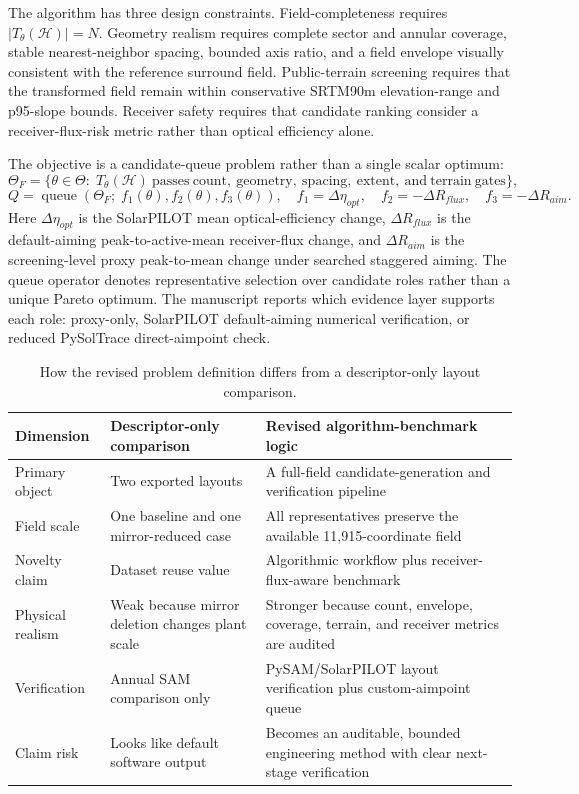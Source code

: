 \documentclass[final,3p,times]{elsarticle}
\begin{document}
The algorithm has three design constraints. Field-completeness requires $|T_\theta(\mathcal{H})|=N$. Geometry realism requires complete sector and annular coverage, stable nearest-neighbor spacing, bounded axis ratio, and a field envelope visually consistent with the reference surround field. Public-terrain screening requires that the transformed field remain within conservative SRTM90m elevation-range and p95-slope bounds. Receiver safety requires that candidate ranking consider a receiver-flux-risk metric rather than optical efficiency alone.

The objective is a candidate-queue problem rather than a single scalar optimum:
\begin{equation}
\Theta_F=\{\theta\in\Theta:\;T_\theta(\mathcal{H})\ \mathrm{passes\ count,\ geometry,\ spacing,\ extent,\ and\ terrain\ gates}\},
\end{equation}
\begin{equation}
Q=\operatorname{queue}\left(\Theta_F;\; f_1(\theta), f_2(\theta), f_3(\theta)\right),
\quad
f_1=\Delta \eta_{opt},\quad
f_2=-\Delta R_{flux},\quad
f_3=-\Delta R_{aim}.
\end{equation}
Here $\Delta \eta_{opt}$ is the SolarPILOT mean optical-efficiency change, $\Delta R_{flux}$ is the default-aiming peak-to-active-mean receiver-flux change, and $\Delta R_{aim}$ is the screening-level proxy peak-to-mean change under searched staggered aiming. The queue operator denotes representative selection over candidate roles rather than a unique Pareto optimum. The manuscript reports which evidence layer supports each role: proxy-only, SolarPILOT default-aiming numerical verification, or reduced PySolTrace direct-aimpoint check.

\begin{table}[t]
\centering
\caption{How the revised problem definition differs from a descriptor-only layout comparison.}
\label{tab:reframe}
\small
\begin{tabular}{p{}p{}p{}}
\toprule
Dimension & Descriptor-only comparison & Revised algorithm-benchmark logic \\
\midrule
Primary object & Two exported layouts & A full-field candidate-generation and verification pipeline \\
Field scale & One baseline and one mirror-reduced case & All representatives preserve the available 11,915-coordinate field \\
Novelty claim & Dataset reuse value & Algorithmic workflow plus receiver-flux-aware benchmark \\
Physical realism & Weak because mirror deletion changes plant scale & Stronger because count, envelope, coverage, terrain, and receiver metrics are audited \\
Verification & Annual SAM comparison only & PySAM/SolarPILOT layout verification plus custom-aimpoint queue \\
Claim risk & Looks like default software output & Becomes an auditable, bounded engineering method with clear next-stage verification \\
\bottomrule
\end{tabular}
\end{table}
\end{document}
